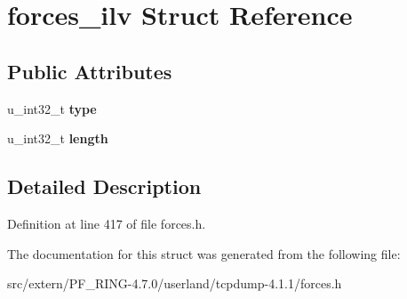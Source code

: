 \hypertarget{structforces__ilv}{
\section{forces\_\-ilv Struct Reference}
\label{structforces__ilv}
}
\subsection*{Public Attributes}
\begin{DoxyCompactItemize}
\item 
\hypertarget{structforces__ilv_ae5be0917d07a5eca9fd2045d7bc54b12}{
u\_\-int32\_\-t {\bfseries type}}
\label{structforces__ilv_ae5be0917d07a5eca9fd2045d7bc54b12}

\item 
\hypertarget{structforces__ilv_adab0a6bb604fd4e44b2a6089b429e07f}{
u\_\-int32\_\-t {\bfseries length}}
\label{structforces__ilv_adab0a6bb604fd4e44b2a6089b429e07f}

\end{DoxyCompactItemize}


\subsection{Detailed Description}


Definition at line 417 of file forces.h.



The documentation for this struct was generated from the following file:\begin{DoxyCompactItemize}
\item 
src/extern/PF\_\-RING-\/4.7.0/userland/tcpdump-\/4.1.1/forces.h\end{DoxyCompactItemize}
